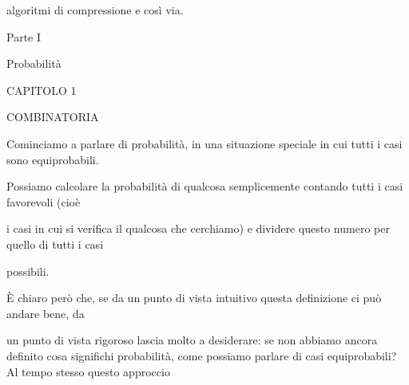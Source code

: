 \documentclass[a4paper,portrait,12pt]{article}
\begin{document}
\begin{flushleft}
algoritmi di compressione e così via.
\end{flushleft}





\begin{flushleft}
\newpage
Parte I
\end{flushleft}


\begin{flushleft}
Probabilit\`{a}
\end{flushleft}





\begin{flushleft}
\newpage
\newpage
CAPITOLO 1
\end{flushleft}


\begin{flushleft}
COMBINATORIA
\end{flushleft}


\begin{flushleft}
Cominciamo a parlare di probabilit\`{a}, in una situazione speciale in cui tutti i casi sono equiprobabili.
\end{flushleft}


\begin{flushleft}
Possiamo calcolare la probabilit\`{a} di qualcosa semplicemente contando tutti i casi favorevoli (cio\`{e}
\end{flushleft}


\begin{flushleft}
i casi in cui si verifica il qualcosa che cerchiamo) e dividere questo numero per quello di tutti i casi
\end{flushleft}


\begin{flushleft}
possibili.
\end{flushleft}


\begin{flushleft}
\`{E} chiaro per\`{o} che, se da un punto di vista intuitivo questa definizione ci pu\`{o} andare bene, da
\end{flushleft}


\begin{flushleft}
un punto di vista rigoroso lascia molto a desiderare: se non abbiamo ancora definito cosa significhi probabilit\`{a}, come possiamo parlare di casi equiprobabili? Al tempo stesso questo approccio
\end{flushleft}
\end{document}
